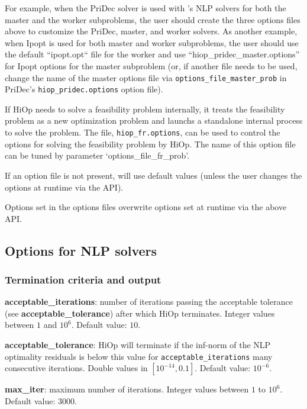 For example, when the PriDec solver is used with \Hi's NLP solvers for both the master and the worker subproblems, the user should create the three options files above to customize the PriDec, master, and worker solvers. As another example, when Ipopt is used for both master and worker subproblems, the user should use the default ``ipopt.opt`` file for the worker and use ``hiop\_pridec\_master.options'' for Ipopt options for the master subproblem (or, if another file needs to be used, change the name of the master options file via \texttt{options\_file\_master\_prob} in PriDec's \texttt{hiop\_pridec.options} option file).

If HiOp needs to solve a feasibility problem internally, it treats the feasibility problem as a new optimization problem and launchs a standalone internal process to solve the problem. The file, \texttt{hiop\_fr.options}, can be used to control the options for solving the feasibility problem by HiOp. The name of this option file can be tuned by parameter `options\_file\_fr\_prob'.

 If an option file is not present, \Hi will use default values (unless the user changes the options at runtime via the API).

 Options set in the options files overwrite options set at runtime via the above API.

\subsection{Options for NLP solvers}


\subsubsection{Termination criteria and output}

\noindent \textbf{acceptable\_iterations}: number of iterations passing the acceptable tolerance (see \textbf{acceptable\_tolerance}) after which HiOp terminates. Integer values between $1$ and $10^6$. Default value: $10$.
\medskip

\noindent \textbf{acceptable\_tolerance}: HiOp will terminate if the inf-norm of the NLP optimality residuals is below this value for \texttt{acceptable\_iterations} many consecutive iterations. 
Double values in $[10^{-14},0.1]$. Default value: $10^{-6}$.
\medskip

\noindent \textbf{max\_iter}: maximum number of iterations. Integer values between $1$ to $10^6$. Default value: $3000$.
\medskip

